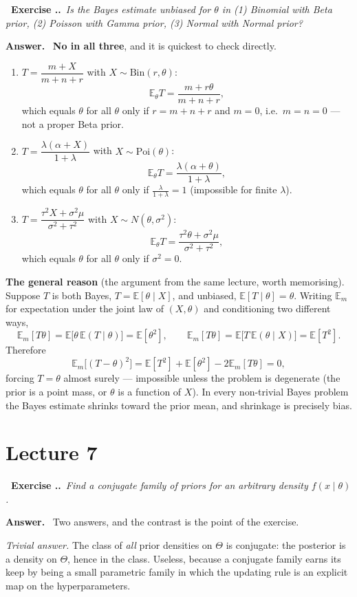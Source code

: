 \documentclass[11pt]{article}
\newcommand{\E}{\mathbb{E}}
\newcounter{exc}[section]
\newenvironment{exc}[1]{\medskip\refstepcounter{exc}%
  \noindent\textbf{\color{ForestGreen}\raisebox{0.5pt}{\scriptsize$\blacksquare$}\ Exercise \thesection.\theexc.}\ \textit{#1}\par\nopagebreak}{\par}
\newcommand{\ans}{\smallskip\noindent\textbf{Answer.}\ }
\begin{document}
\begin{exc}{Is the Bayes estimate unbiased for $\theta$ in (1) Binomial with Beta prior,
(2) Poisson with Gamma prior, (3) Normal with Normal prior?}
\end{exc}
\ans
\textbf{No in all three}, and it is quickest to check directly.
\begin{enumerate}
\item[(1)] $T=\dfrac{m+X}{m+n+r}$ with $X\sim\mathrm{Bin}(r,\theta)$:
\[
\E_\theta T=\frac{m+r\theta}{m+n+r},
\]
which equals $\theta$ for all $\theta$ only if $r=m+n+r$ and $m=0$, i.e.\ $m=n=0$ --- not a
proper Beta prior.
\item[(2)] $T=\dfrac{\lambda(\alpha+X)}{1+\lambda}$ with $X\sim\mathrm{Poi}(\theta)$:
\[
\E_\theta T=\frac{\lambda(\alpha+\theta)}{1+\lambda},
\]
which equals $\theta$ for all $\theta$ only if $\tfrac{\lambda}{1+\lambda}=1$ (impossible for
finite $\lambda$).
\item[(3)] $T=\dfrac{\tau^2X+\sigma^2\mu}{\sigma^2+\tau^2}$ with $X\sim N(\theta,\sigma^2)$:
\[
\E_\theta T=\frac{\tau^2\theta+\sigma^2\mu}{\sigma^2+\tau^2},
\]
which equals $\theta$ for all $\theta$ only if $\sigma^2=0$.
\end{enumerate}

\textbf{The general reason} (the argument from the same lecture, worth memorising). Suppose
$T$ is both Bayes, $T=\E[\theta\mid X]$, and unbiased, $\E[T\mid\theta]=\theta$. Writing
$\E_m$ for expectation under the joint law of $(X,\theta)$ and conditioning two different
ways,
\[
\E_m[T\theta]=\E\big[\theta\,\E(T\mid\theta)\big]=\E[\theta^2],
\qquad
\E_m[T\theta]=\E\big[T\,\E(\theta\mid X)\big]=\E[T^2].
\]
Therefore
\[
\E_m\big[(T-\theta)^2\big]=\E[T^2]+\E[\theta^2]-2\E_m[T\theta]=0,
\]
forcing $T=\theta$ almost surely --- impossible unless the problem is degenerate (the prior
is a point mass, or $\theta$ is a function of $X$). In every non-trivial Bayes problem the
Bayes estimate shrinks toward the prior mean, and shrinkage is precisely bias.

\section{Lecture 7}

\begin{exc}{Find a conjugate family of priors for an arbitrary density $f(x\mid\theta)$.}
\end{exc}
\ans
Two answers, and the contrast is the point of the exercise.

\emph{Trivial answer.} The class of \emph{all} prior densities on $\Theta$ is conjugate: the
posterior is a density on $\Theta$, hence in the class. Useless, because a conjugate family
earns its keep by being a small parametric family in which the updating rule is an explicit
map on the hyperparameters.
\end{document}
